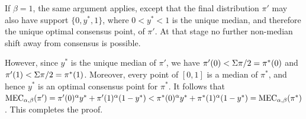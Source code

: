 If $\beta=1$, the same argument applies, except that the final distribution $\pi'$ may also have support $\{0,y^*,1\}$, where $0<y^*<1$ is the unique median, and therefore the unique optimal consensus point, of $\pi'$. At that stage no further non-median shift away from consensus is possible.

However, since $y^*$ is the unique median of $\pi'$, we have $\pi'(0)<\Sigma \pi/2=\pi^*(0)$ and $\pi'(1)<\Sigma \pi/2=\pi^*(1)$. Moreover, every point of $[0,1]$ is a median of $\pi^*$, and hence $y^*$ is an optimal consensus point for $\pi^*$. It follows that $\MEC(\pi')=\pi'(0)^\alpha y^*+\pi'(1)^\alpha(1-y^*)<\pi^*(0)^\alpha y^*+\pi^*(1)^\alpha(1-y^*)=\MEC(\pi^*)$. This completes the proof.

